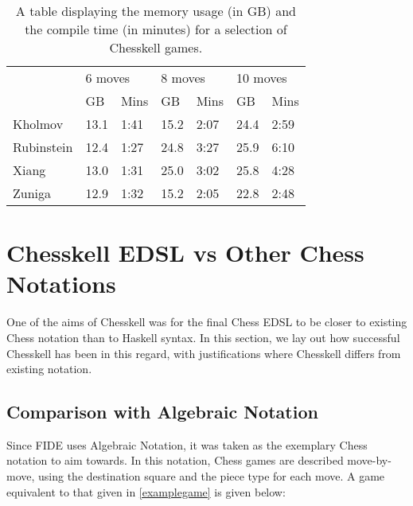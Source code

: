 \begin{table}[h]
    \centering
    \label{performancetable}
    \begin{tabular}{l|ll|ll|ll}
                   & \multicolumn{2}{|l|}{6 moves} & \multicolumn{2}{|l|}{8 moves} & \multicolumn{2}{|l}{10 moves}                      \\
                   & GB                            & Mins                          & GB                            & Mins & GB   & Mins \\
        \hline
        Kholmov    & 13.1                          & 1:41                          & 15.2                          & 2:07 & 24.4 & 2:59 \\
        Rubinstein & 12.4                          & 1:27                          & 24.8                          & 3:27 & 25.9 & 6:10 \\
        Xiang      & 13.0                          & 1:31                          & 25.0                          & 3:02 & 25.8 & 4:28 \\
        Zuniga     & 12.9                          & 1:32                          & 15.2                          & 2:05 & 22.8 & 2:48
    \end{tabular}
    \caption{A table displaying the memory usage (in GB) and the compile time (in minutes) for a selection of Chesskell games.}
\end{table}

\section{Chesskell EDSL vs Other Chess Notations}

One of the aims of Chesskell was for the final Chess EDSL to be closer to existing Chess notation than to Haskell syntax. In this section, we lay out how successful Chesskell has been in this regard, with justifications where Chesskell differs from existing notation.

\subsection{Comparison with Algebraic Notation}

Since FIDE uses Algebraic Notation, it was taken as the exemplary Chess notation to aim towards. In this notation, Chess games are described move-by-move, using the destination square and the piece type for each move. A game equivalent to that given in \cref{examplegame} is given below:

